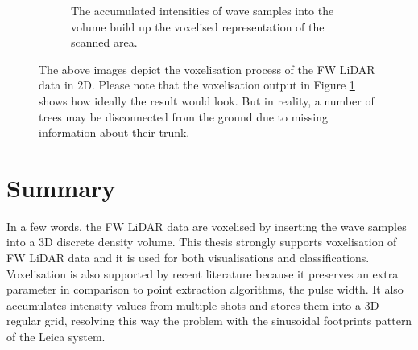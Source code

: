 \documentclass{subfiles}
\begin{document}
\begin{figure} [h!]
\begin{subfigure}[t]{.31\textwidth}
\caption{The accumulated intensities of wave samples into the volume build up the voxelised representation of the scanned area.} 
\label{fig:VoxelisationC_voxelised}
\end{subfigure}
\caption[Voxelisation of FW LiDAR data]{The above images depict the voxelisation process of the FW LiDAR data in 2D. Please note that the voxelisation output in Figure \ref{fig:VoxelisationC_voxelised} shows how ideally the result would look. But in reality, a number of trees may be disconnected from the ground due to missing information about their trunk.}
\label{fig:Voxelisation}
\end{figure}


\section{Summary}

In a few words, the FW LiDAR data are voxelised by inserting the wave samples into a 3D discrete density volume. This thesis strongly supports voxelisation of FW LiDAR data and it is used for both visualisations and classifications. Voxelisation is also supported by recent literature \cite{Cao2016} \cite{Sumnall2016} because it preserves an extra parameter in comparison to point extraction algorithms, the pulse width. It also accumulates intensity values from multiple shots and stores them into a 3D regular grid, resolving this way the problem with the sinusoidal footprints pattern of the Leica system. 
\end{document}
